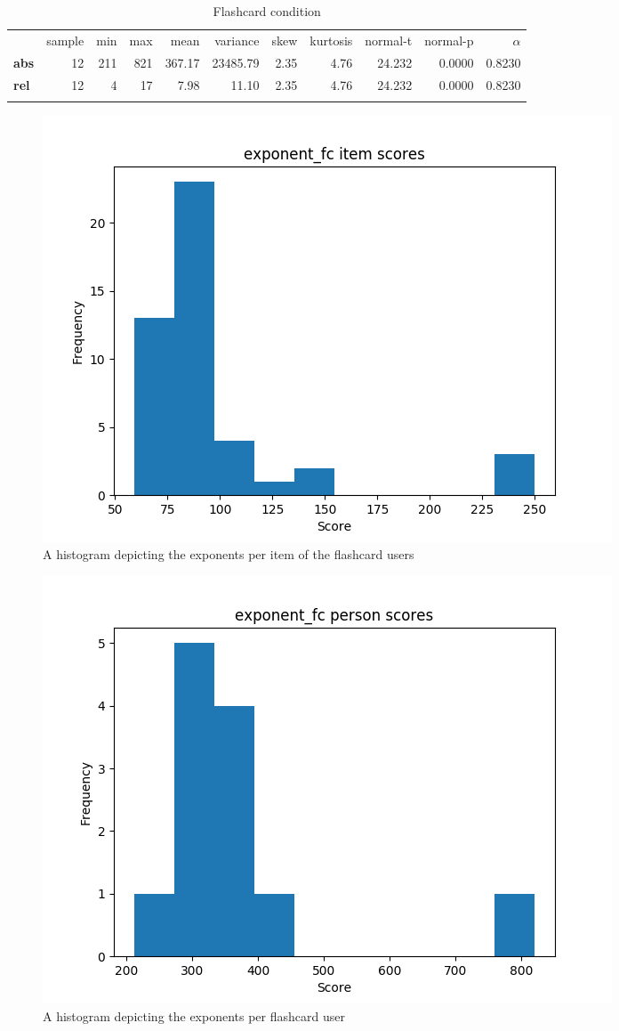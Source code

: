 \begin{longtable}[c]{@{}lrrrrrrrrrr@{}}
    \caption{Flashcard condition}
    \endfirsthead
\toprule\addlinespace
& sample & min & max & mean & variance & skew & kurtosis & normal-t &
normal-p & $\alpha$
\\\addlinespace
\midrule
\textbf{abs} & 12 & 211 & 821 & 367.17 & 23485.79 & 2.35 & 4.76 & 24.232
& 0.0000 & 0.8230
\\\addlinespace
\textbf{rel} & 12 & 4 & 17 & 7.98 & 11.10 & 2.35 & 4.76 & 24.232 &
0.0000 & 0.8230
\\\addlinespace
\bottomrule
    \label{tab:exponent_fc}
\end{longtable}

\begin{figure}
\includegraphics[width=\textwidth]{img/exponent_fc_diff.png}
    \caption{A histogram depicting the exponents per item of the flashcard users}
    \label{fig:exponent_fc_diff}
\end{figure}
\begin{figure}
\includegraphics[width=\textwidth]{img/exponent_fc_abil.png}
    \caption{A histogram depicting the exponents per flashcard user}
    \label{fig:exponent_fc_abil}
\end{figure}

